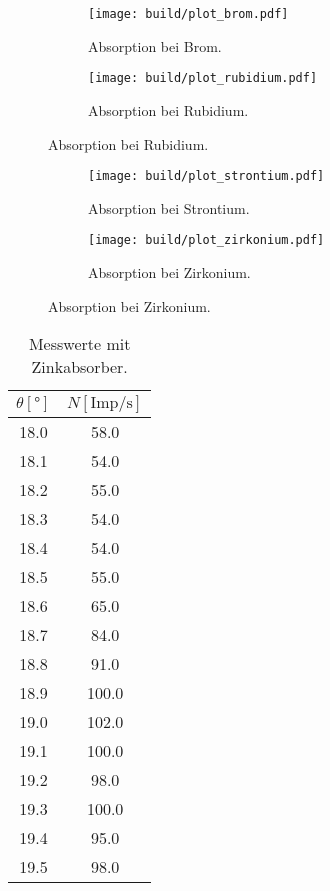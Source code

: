   \begin{figure}
    \centering
    \begin{subfigure}{0.30\textwidth}
      \centering
      \texttt{[image: build/plot\_brom.pdf]}
      \caption{Absorption bei Brom.}
      \label{fig:brom}
    \end{subfigure}
    \hfill
    \begin{subfigure}{0.30\textwidth}
      \centering
      \texttt{[image: build/plot\_rubidium.pdf]}
      \caption{Absorption bei Rubidium.}
      \label{fig:rubidium}
    \end{subfigure}
  \end{figure}

  \begin{figure}
    \centering
    \begin{subfigure}{0.30\textwidth}
      \texttt{[image: build/plot\_strontium.pdf]}
      \caption{Absorption bei Strontium.}
      \label{fig:strontium}
    \end{subfigure}
    \hfill
    \begin{subfigure}{0.30\textwidth}
      \texttt{[image: build/plot\_zirkonium.pdf]}
      \caption{Absorption bei Zirkonium.}
      \label{fig:zirkonium}
    \end{subfigure}
  \end{figure}

  \FloatBarrier

  \begin{table}
    \centering
    \caption{Messwerte mit Zinkabsorber.}
    \label{tab:zinktab}
    \begin{tabular}{c c}
      \toprule
      $\theta [°]$ & $N [\text{Imp}/\si{\s}]$ \\
      \midrule
      18.0	& 58.0\\
      18.1	& 54.0\\
      18.2	& 55.0\\
      18.3	& 54.0\\
      18.4	& 54.0\\
      18.5	& 55.0\\
      18.6	& 65.0\\
      18.7	& 84.0\\
      18.8	& 91.0\\
      18.9	& 100.0\\
      19.0	& 102.0\\
      19.1	& 100.0\\
      19.2	& 98.0\\
      19.3	& 100.0\\
      19.4	& 95.0\\
      19.5	& 98.0\\
      \bottomrule
    \end{tabular}
  \end{table}

